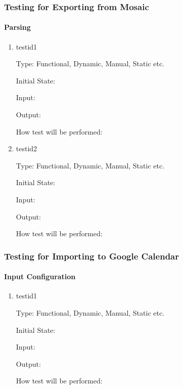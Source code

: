 \documentclass[12pt, titlepage]{article}
\begin{document}
\subsubsection{Testing for Exporting from Mosaic}

\paragraph{Parsing}

\begin{enumerate}

\item{testid1\\}

Type: Functional, Dynamic, Manual, Static etc.
					
Initial State: 
					
Input: 
					
Output: 
					
How test will be performed: 

\item{testid2\\}

Type: Functional, Dynamic, Manual, Static etc.
					
Initial State: 
					
Input: 
					
Output: 
					
How test will be performed: 
\end{enumerate}

\subsubsection{Testing for Importing to Google Calendar}

\paragraph{Input Configuration}

\begin{enumerate}

\item{testid1\\}

Type: Functional, Dynamic, Manual, Static etc.
					
Initial State: 
					
Input: 
					
Output: 
					
How test will be performed: 
\end{enumerate}
\end{document}

